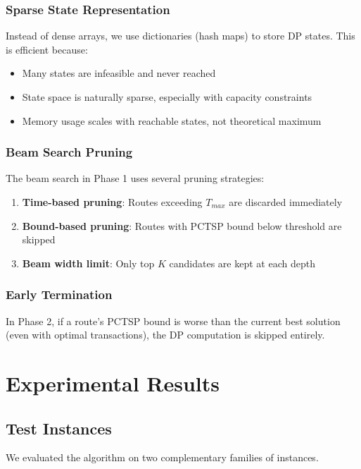 \documentclass[12pt]{article}
\begin{document}
\subsubsection{Sparse State Representation}

Instead of dense arrays, we use dictionaries (hash maps) to store DP states. This is efficient because:
\begin{itemize}
    \item Many states are infeasible and never reached
    \item State space is naturally sparse, especially with capacity constraints
    \item Memory usage scales with reachable states, not theoretical maximum
\end{itemize}

\subsubsection{Beam Search Pruning}

The beam search in Phase 1 uses several pruning strategies:
\begin{enumerate}
    \item \textbf{Time-based pruning}: Routes exceeding $T_{max}$ are discarded immediately
    \item \textbf{Bound-based pruning}: Routes with PCTSP bound below threshold are skipped
    \item \textbf{Beam width limit}: Only top $K$ candidates are kept at each depth
\end{enumerate}

\subsubsection{Early Termination}

In Phase 2, if a route's PCTSP bound is worse than the current best solution (even with optimal transactions), the DP computation is skipped entirely.

\section{Experimental Results}
\label{sec:results}

\subsection{Test Instances}

We evaluated the algorithm on two complementary families of instances.
\end{document}
